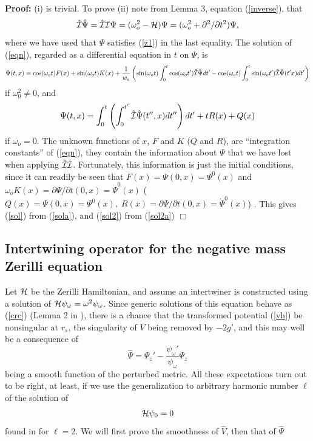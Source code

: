 \documentclass[aps,floats,showpacs,amssymb,tightenlines]{revtex4}
\def\w{\omega}
\def\p{\partial}
\def\I{{\cal I}}
\begin{document}
\noindent
{\bf Proof:} (i) is trivial. To prove (ii) note from Lemma 3, equation (\ref{inverse}),  that
\begin{equation} \label{eqn}
  \hat \I \hat \Psi = \hat \I \I \Psi =  (\w_o^2 - {\cal H}) \Psi = (\w_o^2 + \p^2  / \p t^2) \Psi ,
\end{equation}
where we have used that $\Psi$ satisfies  (\ref{z1}) in the last equality.
 The solution of (\ref{eqn}), regarded as a  differential equation in $t$  on $\Psi$, is
\begin{equation} \label{sola}
\Psi(t,x) =  \cos (\w_o t) F(x) + \sin (\w_o t) K(x) + \frac{1}{w_o} \left(
\sin (\w_o t) \int_0^t \cos (\w_o t')  \hat \I \hat \Psi dt' -\cos (\w_o t) \int_0^t \sin (\w_o t')  \hat \I \hat \Psi(t'x) dt' \right)
\end{equation}
if $\w_0^2 \neq 0$, and
\begin{equation}  \label{sol2a}
\Psi(t,x) = \int_0^t \left( \int_0^{t'}  \hat \I \hat \Psi(t'',x) dt'' \right) dt' + t R(x) + Q(x)
\end{equation}
if $\w_o =0$. The unknown functions of $x$, $F$ and $K$ ($Q$ and $R$), are ``integration constants'' of (\ref{eqn}),
 they contain  the information about $\Psi$ that we have lost
when applying $\hat \I \I$. Fortunately, this information  is just the
initial conditions, since it can readily be seen that $F(x) = \Psi(0,x)= \Psi^0(x) $ and $\w_o K(x)=\p \Psi / \p t (0,x) =
\dot \Psi^0 (x)$ ($Q(x) = \Psi(0,x)= \Psi^0(x), \;R(x)=\p \Psi / \p t (0,x) =
\dot \Psi^0 (x)$) .
This gives (\ref{sol}) from (\ref{sola}), and (\ref{sol2}) from (\ref{sol2a}) $\Box$\\


\subsection{Intertwining operator for the negative mass Zerilli equation} \label{apli}

Let ${\cal H}$ be the Zerilli Hamiltonian, and assume an intertwiner is constructed using a solution of
 ${\cal H} \psi_{\w} = \w^2 \psi_{\w}$. Since generic
solutions of this equation behave as (\ref{crc}) (Lemma 2 in \cite{dg}), there is a chance
that the transformed potential (\ref{vh}) be nonsingular at $r_s$, the singularity of $V$ being removed by $-2g'$,
and this may well be a consequence of
\begin{equation}\label{hpsi1}
\hat \Psi = \Psi_z' - \frac{\psi_{\w}{}'}{\psi_{\w}} \Psi_z
\end{equation}
being a smooth function of the perturbed metric. All these expectations
turn out to be right, at least, if we  use the generalization to
arbitrary harmonic number $\ell$ of the solution of
\begin{equation}\label{zm1}
{\cal H} \psi_0 = 0
\end{equation}
found in \cite{ghi} for $\ell=2$. We will first prove the smoothness of $\hat V$, then that of $\hat \Psi$\\
\end{document}
